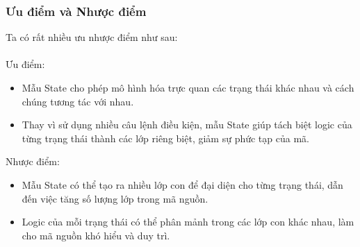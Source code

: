 \subsubsection{Ưu điểm và Nhược điểm}
Ta có rất nhiều ưu nhược điểm như sau:\\\\
Ưu điểm:
\begin{itemize}
    \item Mẫu State cho phép mô hình hóa trực quan các trạng thái khác nhau và cách chúng tương tác với nhau.
    \item Thay vì sử dụng nhiều câu lệnh điều kiện, mẫu State giúp tách biệt logic của từng trạng thái thành các lớp riêng biệt, giảm sự phức tạp của mã.
\end{itemize}
Nhược điểm:
\begin{itemize}
    \item Mẫu State có thể tạo ra nhiều lớp con để đại diện cho từng trạng thái, dẫn đến việc tăng số lượng lớp trong mã nguồn.
    \item Logic của mỗi trạng thái có thể phân mảnh trong các lớp con khác nhau, làm cho mã nguồn khó hiểu và duy trì.
\end{itemize}
